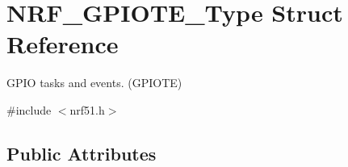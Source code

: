 \hypertarget{struct_n_r_f___g_p_i_o_t_e___type}{}\section{N\+R\+F\+\_\+\+G\+P\+I\+O\+T\+E\+\_\+\+Type Struct Reference}
\label{struct_n_r_f___g_p_i_o_t_e___type}


G\+P\+I\+O tasks and events. (G\+P\+I\+O\+T\+E)  




{\ttfamily \#include $<$nrf51.\+h$>$}

\subsection*{Public Attributes}

